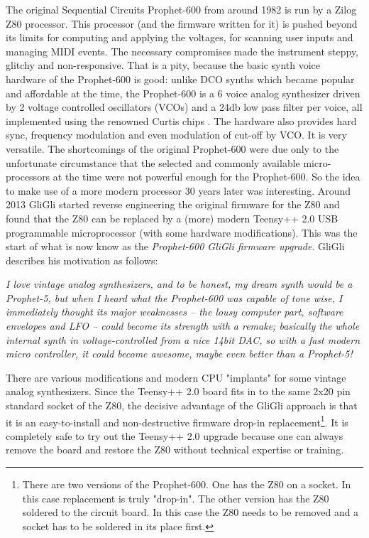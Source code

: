 \documentclass[landscape, 11pt, oneside, twoside]{report}
\newenvironment{flowtext}{\addmargin[0cm]{0cm}}{\endaddmargin} %
\begin{document}
\setcounter{page}{1}

\begin{flowtext}


The original Sequential Circuits Prophet-600 from around 1982 is run by a Zilog Z80 processor. This processor (and the firmware written for it) is pushed beyond its limits for computing and applying the voltages, for scanning user inputs and managing MIDI events. The necessary compromises made the instrument steppy, glitchy and non-responsive. That is a pity, because the basic synth voice hardware of the Prophet-600 is good: unlike DCO synths which became popular and affordable at the time, the Prophet-600 is a 6 voice analog synthesizer driven by 2 voltage controlled oscillators (VCOs) and a 24db low pass filter per voice, all implemented using the renowned Curtis chips \cite{curtis}. The hardware also provides hard sync, frequency modulation and even modulation of cut-off by VCO. It is very versatile. The shortcomings of the original Prophet-600 were due only to the unfortunate circumstance that the selected and commonly available micro-processors at the time were not powerful enough for the Prophet-600. So the idea to make use of a more modern processor 30 years later was interesting. Around 2013 GliGli \cite{gligli} started reverse engineering the original firmware for the Z80 and found that the Z80 can be replaced by a (more) modern Teensy++ 2.0 USB programmable microprocessor \cite{teensy} (with some hardware modifications). This was the start of what is now know as the \textit{Prophet-600 GliGli firmware upgrade}. GliGli describes his motivation as follows:

\begin{addmargin}[2cm]{1cm}

\textit{I love vintage analog synthesizers, and to be honest, my dream synth would be a Prophet-5, but when I heard what the Prophet-600 was capable of tone wise, I immediately thought its major weaknesses -- the lousy computer part, software envelopes and LFO -- could become its strength with a remake; basically the whole internal synth in voltage-controlled from a nice 14bit DAC, so with a fast modern micro controller, it could become awesome, maybe even better than a Prophet-5!}

\end{addmargin}

There are various modifications and modern CPU "implants" for some vintage analog synthesizers. Since the Teensy++ 2.0 board fits in to the same 2x20 pin standard socket of the Z80, the decisive advantage of the GliGli approach is that it is an easy-to-install and non-destructive firmware drop-in replacement\footnote{There are two versions of the Prophet-600. One has the Z80 on a socket. In this case replacement is truly "drop-in". The other version has the Z80 soldered to the circuit board. In this case the Z80 needs to be removed and a socket has to be soldered in its place first.}. It is completely safe to try out the Teensy++ 2.0 upgrade because one can always remove the board and restore the Z80 without technical expertise or training. 


\end{flowtext}
\end{document}
